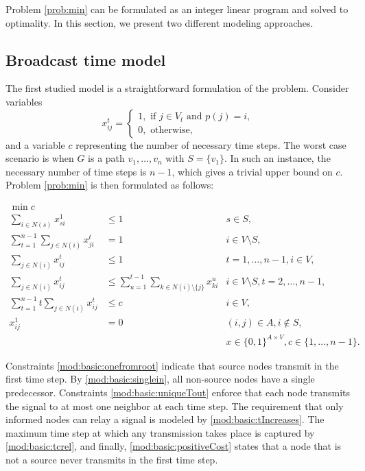 Problem \ref{prob:min} can be formulated as an integer linear program and solved to optimality. In this section, we present two different modeling approaches. 

\subsection{Broadcast time model}
The first studied model is a straightforward formulation of the problem.
Consider variables 
$$ x_{ij}^t=
\begin{cases} 
1, \text{ if } j\in V_t \text{ and } p(j)=i,\\ 
0, \text{ otherwise},
\end{cases}
$$
and a variable $c$ representing the number of necessary time steps.
The worst case scenario is when $G$ is a path $v_1,\dots,v_n$ with $S=\{v_1\}$. 
In such an instance, the necessary number of time steps is $n-1$, which gives a trivial upper bound on $c$.
Problem \ref{prob:min} is then formulated as follows: 

\begin{subequations}\label{mod:basic}
\begin{align}
\label{mod:basic:obj} \min c \\ 
\label{mod:basic:onefromroot} \sum_{i \in N(s)}x^1_{si} & \leq 1 & s\in S,\\
\label{mod:basic:singlein} \sum\limits_{t=1}^{n-1}\sum\limits_{j\in N(i)}x_{ji}^t & = 1 & i\in V \setminus S,\\
\label{mod:basic:uniqueTout} \sum\limits_{j\in N(i)}x_{ij}^t & \leq 1  & t=1,\dots,n-1,i\in V,\\
\label{mod:basic:tIncreases} \sum\limits_{j\in N(i)}x_{ij}^t &\leq\sum\limits_{u=1}^{t-1}\sum\limits_{k\in N(i)\setminus\{j\}} x_{ki}^u  & i\in V\setminus S, t=2,\dots,n-1,\\
\label{mod:basic:tcrel} \sum\limits_{t=1}^{n-1}t\sum\limits_{j\in N(i)}x_{ij}^t & \leq c &  i\in V,\\
\label{mod:basic:positiveCost}x_{ij}^1 & = 0 & (i,j)\in A, i \not\in S,\\
\label{mod:basic:dim}&&x \in \{0,1\}^{A\times V}, c \in\{1,\dots,n-1\}.
\end{align}~
\end{subequations}

Constraints \eqref{mod:basic:onefromroot} indicate that source nodes transmit in the first time step.
By \eqref{mod:basic:singlein}, all non-source nodes have a single predecessor.
Constraints \eqref{mod:basic:uniqueTout} enforce that each node transmits the signal to at most one neighbor at each time step.
The requirement that only informed nodes can relay a signal is modeled by \eqref{mod:basic:tIncreases}. 
The maximum time step at which any transmission takes place is captured by \eqref{mod:basic:tcrel}, and finally, \eqref{mod:basic:positiveCost} states that a node that is not a source never transmits in the first time step.

